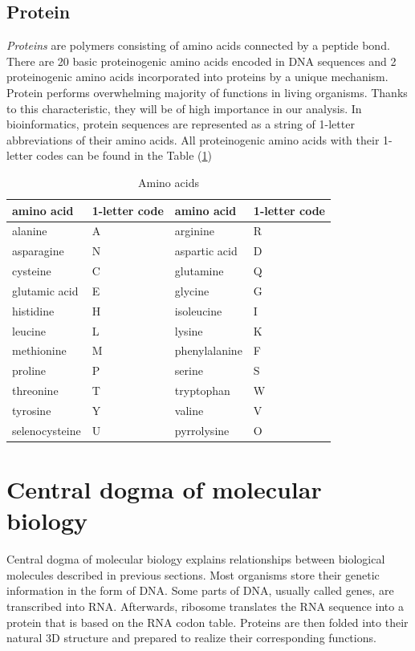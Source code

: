 \subsection{Protein}
\emph{Proteins} are polymers consisting of amino acids connected by a peptide bond.
There are 20 basic proteinogenic amino acids encoded in DNA sequences and 2 proteinogenic amino acids incorporated into proteins by a unique mechanism.
Protein performs overwhelming majority of functions in living organisms.
Thanks to this characteristic, they will be of high importance in our analysis.
In bioinformatics, protein sequences are represented as a string of 1-letter abbreviations of their amino acids. All proteinogenic amino acids with their 1-letter codes can be found in the Table (\ref{tab:amino})

\begin{table}
 \centering
        \begin{tabular}{ l  l  l  l }
         \hline
         amino acid & 1-letter code & amino acid & 1-letter code \\
         \hline  
         alanine & A & arginine & R \\
         asparagine & N & aspartic acid & D \\
         cysteine & C & glutamine & Q \\
         glutamic acid & E & glycine & G \\
         histidine & H & isoleucine & I \\
         leucine & L & lysine & K \\
         methionine & M & phenylalanine & F \\
         proline & P & serine & S \\
         threonine & T & tryptophan & W \\
         tyrosine & Y & valine & V \\
         selenocysteine & U & pyrrolysine & O \\
         \hline
        \end{tabular}
        \caption{Amino acids}
        \label{tab:amino}
\end{table}



\section{Central dogma of molecular biology}
Central dogma of molecular biology explains relationships between biological molecules described in previous sections.
Most organisms store their genetic information in the form of DNA.
Some parts of DNA, usually called genes, are transcribed into RNA.
Afterwards, ribosome translates the RNA sequence into a protein that is based on the RNA codon table.
Proteins are then folded into their natural 3D structure and prepared to realize their corresponding functions.

